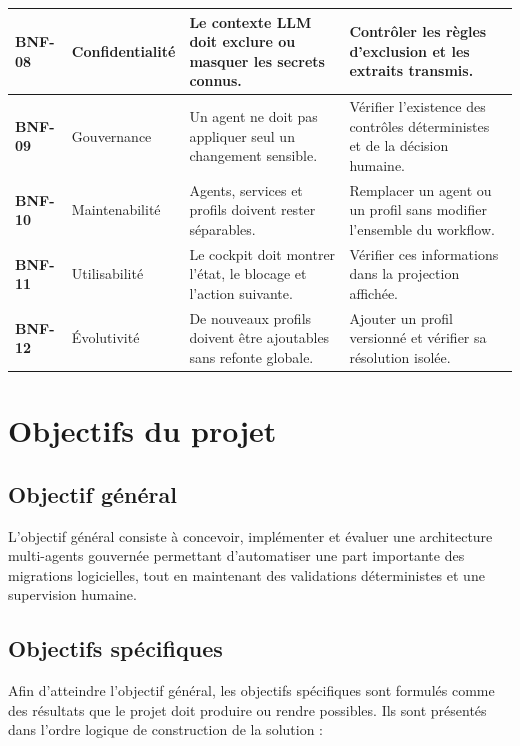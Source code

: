 \begin{longtable}{|>{\bfseries\RaggedRight\arraybackslash}p{1cm}|>{\RaggedRight\arraybackslash}p{2.5cm}|>{\RaggedRight\arraybackslash}p{5.1cm}|>{\RaggedRight\arraybackslash}p{5.1cm}|}
    \hline
    BNF-08 & Confidentialité & Le contexte LLM doit exclure ou masquer les secrets connus. & Contrôler les règles d'exclusion et les extraits transmis. \\
    \hline
    BNF-09 & Gouvernance & Un agent ne doit pas appliquer seul un changement sensible. & Vérifier l'existence des contrôles déterministes et de la décision humaine. \\
    \hline
    BNF-10 & Maintenabilité & Agents, services et profils doivent rester séparables. & Remplacer un agent ou un profil sans modifier l'ensemble du workflow. \\
    \hline
    BNF-11 & Utilisabilité & Le cockpit doit montrer l'état, le blocage et l'action suivante. & Vérifier ces informations dans la projection affichée. \\
    \hline
    BNF-12 & Évolutivité & De nouveaux profils doivent être ajoutables sans refonte globale. & Ajouter un profil versionné et vérifier sa résolution isolée. \\
    \hline
\end{longtable}
\normalsize

\section{Objectifs du projet}

\subsection{Objectif général}

L'objectif général consiste à concevoir, implémenter et évaluer une architecture multi-agents gouvernée permettant d'automatiser une part importante des migrations logicielles, tout en maintenant des validations déterministes et une supervision humaine.

\subsection{Objectifs spécifiques}

Afin d'atteindre l'objectif général, les objectifs spécifiques sont formulés comme des résultats que le projet doit produire ou rendre possibles. Ils sont présentés dans l'ordre logique de construction de la solution :

